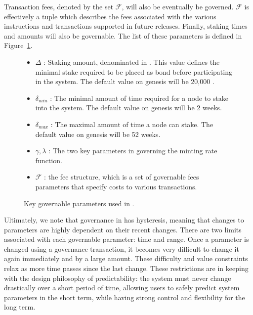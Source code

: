 \documentclass[runningheads]{llncs}
\begin{document}
Transaction fees, denoted by the set $\mathcal{F}$, will also be eventually be governed. 
$\mathcal{F}$ is effectively a tuple which describes the fees associated with the various instructions and transactions supported in future releases. 
Finally, staking times and amounts will also be governable. 
The list of these parameters is defined in Figure~\ref{fig:notation}.

\begin{figure}[hbtp]
\begin{framed}
\begin{itemize}
\item{$\Delta$} : Staking amount, denominated in \AVATokenName{}. This value defines the minimal stake required to be placed as bond before participating in the system. The default value on genesis will be 20,000 \AVATokenName{}.
\item{$\delta_{min}$} : The minimal amount of time required for a node to stake into the system. The default value on genesis will be 2 weeks.
\item{$\delta_{max}$} : The maximal amount of time a node can stake. The default value on genesis will be 52 weeks.
\item{$\gamma, \lambda$} : The two key parameters in governing the minting rate function. 
\item{$\mathcal{F}$} : the fee structure, which is a set of governable fees parameters that specify costs to various transactions.
\end{itemize}
\end{framed}
\caption{Key governable parameters used in \AVAPlatformName{}.}
\label{fig:notation}
\end{figure}

Ultimately, we note that governance in \AVATokenName{} has hysteresis, meaning that changes to parameters are highly dependent on their recent changes. There are two limits associated with each governable parameter: time and range. Once a parameter is changed using a governance transaction, it becomes very difficult to change it again immediately and by a large amount.  These difficulty and value constraints relax as more time passes since the last change. These restrictions are in keeping with the design philosophy of predictability: the system must never change drastically over a short period of time, allowing users to safely predict system parameters in the short term, while having strong control and flexibility for the long term.
\end{document}
